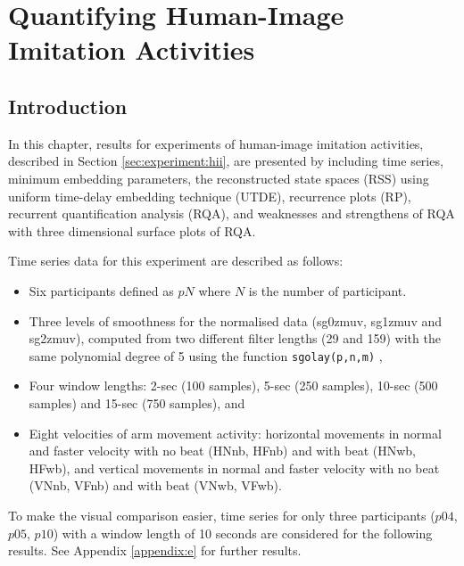
\chapter{Quantifying Human-Image Imitation Activities} \label{chapter5}

%

\graphicspath{{figs/chapter5/PDF/}}

\section{Introduction}
In this chapter, results for experiments of human-image imitation 
activities, described in Section \ref{sec:experiment:hii},  
are presented by including time series, minimum embedding parameters, 
the reconstructed state spaces (RSS) using 
uniform time-delay embedding technique (UTDE), 
recurrence plots (RP),
recurrent quantification analysis (RQA), and 
weaknesses and strengthens of RQA with 
three dimensional surface plots of RQA. 

Time series data for this experiment are described as follows:
\begin{itemize}

\item Six participants defined as $pN$ where $N$ is the number of 
	participant.

\item Three levels of smoothness for the normalised data 
(sg0zmuv, sg1zmuv and sg2zmuv), computed from two different filter 
lengths (29 and 159) with the same polynomial degree of 5 using the 
function \texttt{sgolay(p,n,m)} \citep{Rsignal},

\item Four window lengths: 2-sec (100 samples), 5-sec (250 samples), 
	10-sec (500 samples) and 15-sec (750 samples), and 

\item Eight velocities of arm movement activity: 
horizontal movements in normal and faster velocity with no
beat (HNnb, HFnb) and with beat (HNwb, HFwb), 
and 
vertical movements in normal and faster velocity with no
beat (VNnb, VFnb) and with beat (VNwb, VFwb).

\end{itemize}
To make the visual comparison easier, time series for only 
three participants ($p04$, $p05$, $p10$) with a window length 
of 10 seconds are considered for the following results.
See Appendix \ref{appendix:e} for further results.

